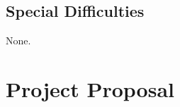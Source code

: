 \documentclass[12pt,notitlepage]{report}
\begin{document}
\section*{Special Difficulties}

None.

\newpage

\tableofcontents


\newpage


\pagestyle{fancy}
\renewcommand{\sectionmark}[1]{\markright{\textsl{\MakeUppercase{\thesection.\ #1}}}}
\lhead{\rightmark}
\rhead{}
\cfoot{\thepage}
\renewcommand{\headrulewidth}{0pt}












\printbibliography[heading=secbib]

\appendix


% 

\chapter{Project Proposal}
\label{sec:Proposal}


\end{document}
